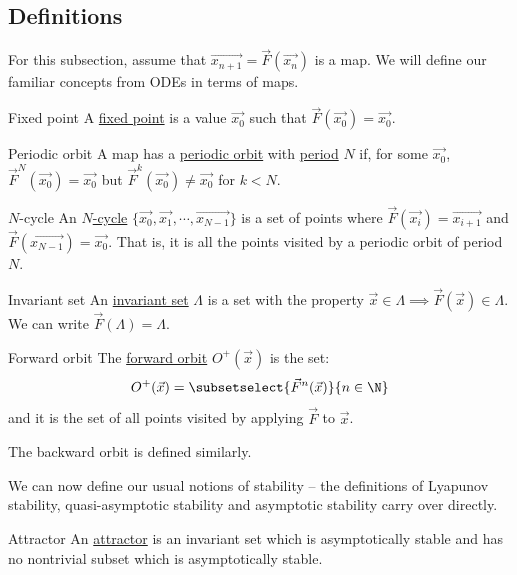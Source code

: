 \documentclass[../Main.tex]{subfiles}
\begin{document}
\subsection{Definitions}
For this subsection, assume that $\vec{x_{n+1}} = \vec{F}(\vec{x_n})$ is a map. We will define our familiar concepts from ODEs in terms of maps.
\begin{definition}{Fixed point}
    A \underline{fixed point} is a value $\vec{x_0}$ such that $\vec{F}(\vec{x_0}) = \vec{x_0}$.
\end{definition}
\begin{definition}{Periodic orbit}
    A map has a \underline{periodic orbit} with \underline{period} $N$ if, for some $\vec{x_0}$, $\vec{F}^N(\vec{x_0}) = \vec{x_0}$ but $\vec F^k(\vec{x_0}) \neq \vec{x_0}$ for $k < N$.
\end{definition}
\begin{definition}{$N$-cycle}
    An \underline{$N$-cycle} $\{\vec{x_0}, \vec{x_1}, \cdots, \vec{x_{N-1}}\}$ is a set of points where $\vec{F}(\vec{x_i}) = \vec{x_{i+1}}$ and $\vec{F}(\vec{x_{N-1}}) = \vec{x_0}$. That is, it is all the points visited by a periodic orbit of period $N$.
\end{definition}
\begin{definition}{Invariant set}
    An \underline{invariant set} $\Lambda$ is a set with the property $\vec x \in \Lambda \implies \vec F(\vec x) \in \Lambda$. We can write $\vec F(\Lambda) = \Lambda$.
\end{definition}
\begin{definition}{Forward orbit}
    The \underline{forward orbit} $O^+(\vec x)$ is the set:
    \begin{equation*}
        O^+(\vec x) = \subsetselect{\vec F^n(\vec x)}{n \in \N}
    \end{equation*}
    and it is the set of all points visited by applying $\vec F$ to $\vec x$.
\end{definition}
The backward orbit is defined similarly.

We can now define our usual notions of stability -- the definitions of Lyapunov stability, quasi-asymptotic stability and asymptotic stability carry over directly.

\begin{definition}{Attractor}
    An \underline{attractor} is an invariant set which is asymptotically stable and has no nontrivial subset which is asymptotically stable.
\end{definition}
\end{document}
